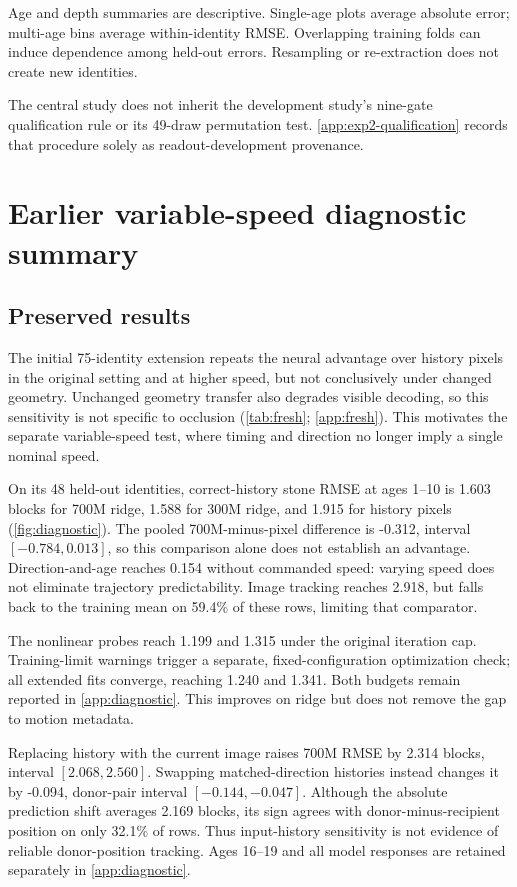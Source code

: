 \documentclass{article}
\begin{document}
Age and depth summaries are descriptive. Single-age plots average absolute error; multi-age bins average within-identity RMSE. Overlapping training folds can induce dependence among held-out errors. Resampling or re-extraction does not create new identities.

The central study does not inherit the development study's nine-gate qualification rule or its 49-draw permutation test. \autoref{app:exp2-qualification} records that procedure solely as readout-development provenance.



\clearpage
\section{Earlier variable-speed diagnostic summary}
\subsection{Preserved results}
\label{app:earlier-summary}
The initial 75-identity extension repeats the neural advantage over history pixels in the original setting and at higher speed, but not conclusively under changed geometry. Unchanged geometry transfer also degrades visible decoding, so this sensitivity is not specific to occlusion (\autoref{tab:fresh}; \autoref{app:fresh}). This motivates the separate variable-speed test, where timing and direction no longer imply a single nominal speed.

On its 48 held-out identities, correct-history stone RMSE at ages 1--10 is 1.603 blocks for 700M ridge, 1.588 for 300M ridge, and 1.915 for history pixels (\autoref{fig:diagnostic}). The pooled 700M-minus-pixel difference is -0.312, interval $[-0.784,0.013]$, so this comparison alone does not establish an advantage. Direction-and-age reaches 0.154 without commanded speed: varying speed does not eliminate trajectory predictability. Image tracking reaches 2.918, but falls back to the training mean on 59.4\% of these rows, limiting that comparator.

The nonlinear probes reach 1.199 and 1.315 under the original iteration cap. Training-limit warnings trigger a separate, fixed-configuration optimization check; all extended fits converge, reaching 1.240 and 1.341. Both budgets remain reported in \autoref{app:diagnostic}. This improves on ridge but does not remove the gap to motion metadata.

Replacing history with the current image raises 700M RMSE by 2.314 blocks, interval $[2.068,2.560]$. Swapping matched-direction histories instead changes it by -0.094, donor-pair interval $[-0.144,-0.047]$. Although the absolute prediction shift averages 2.169 blocks, its sign agrees with donor-minus-recipient position on only 32.1\% of rows. Thus input-history sensitivity is not evidence of reliable donor-position tracking. Ages 16--19 and all model responses are retained separately in \autoref{app:diagnostic}.
\end{document}
